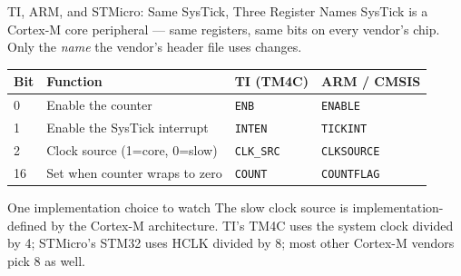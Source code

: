 \documentclass[9pt,aspectratio=169,xcolor=table]{beamer}
\newcommand{\striped}{\rowcolors{1}{white}{stripe}}
\begin{document}
\begin{frame}{TI, ARM, and STMicro: Same SysTick, Three Register Names}
    \leavevmode
    {\small SysTick is a Cortex-M core peripheral --- same registers, same
    bits on every vendor's chip. Only the \emph{name} the vendor's header
    file uses changes.}

    \vspace{3mm}
    \begin{center}
    {\footnotesize
    \striped
    \begin{tabular}{@{}l l l l@{}}
        \toprule
        \textbf{Bit} & \textbf{Function} & \textbf{TI (TM4C)} & \textbf{ARM / CMSIS} \\
        \midrule
        0  & Enable the counter               & \texttt{ENB}     & \texttt{ENABLE} \\
        1  & Enable the SysTick interrupt     & \texttt{INTEN}   & \texttt{TICKINT} \\
        2  & Clock source (1=core, 0=slow)    & \texttt{CLK\_SRC}& \texttt{CLKSOURCE} \\
        16 & Set when counter wraps to zero   & \texttt{COUNT}   & \texttt{COUNTFLAG} \\
        \bottomrule
    \end{tabular}}
    \end{center}

    \vspace{3mm}
    \begin{block}{One implementation choice to watch}
        {\small The slow clock source is \alert{implementation-defined} by
        the Cortex-M architecture. TI's TM4C uses the system clock divided
        by \alert{4}; STMicro's STM32 uses HCLK divided by \alert{8}; most
        other Cortex-M vendors pick \alert{8} as well.}
    \end{block}
\end{frame}
\end{document}
